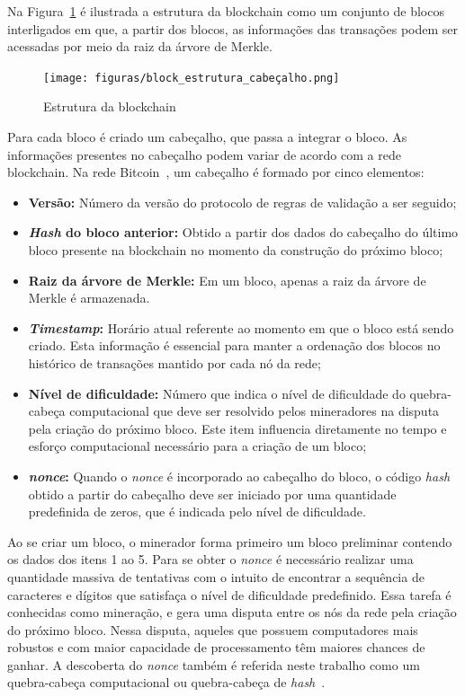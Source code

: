 Na Figura~\ref{fig:blockchain_estrutura} é ilustrada a estrutura da blockchain como um conjunto de blocos interligados em que, a partir dos blocos, as informações das transações podem ser acessadas por meio da raiz da árvore de Merkle. 

\begin{figure}[htb]
 \caption{Estrutura da blockchain}
 \label{fig:blockchain_estrutura}
 \centering
 \texttt{[image: figuras/block\_estrutura\_cabeçalho.png]}
\end{figure}

Para cada bloco é criado um cabeçalho, que passa a integrar o bloco. As informações presentes no cabeçalho podem variar de acordo com a rede blockchain. Na rede Bitcoin~\cite{overview-bitcoin2008nakamoto}, um cabeçalho é formado por cinco elementos:  
\begin{itemize}
    \item \textbf{Versão:} Número da versão do protocolo de regras de validação a ser seguido; 
    \item \textbf{\textit{Hash} do bloco anterior:} Obtido a partir dos dados do cabeçalho do último bloco presente na blockchain no momento da construção do próximo bloco;
    \item \textbf{Raiz da árvore de Merkle:} Em um bloco, apenas a raiz da árvore de Merkle é armazenada. 
    \item \textbf{\textit{Timestamp}:} Horário atual referente ao momento em que o bloco está sendo criado. Esta informação é essencial para manter a ordenação dos blocos no histórico de transações mantido por cada nó da rede;
    \item \textbf{Nível de dificuldade:} Número que indica o nível de dificuldade do quebra-cabeça computacional que deve ser resolvido pelos mineradores na disputa pela criação do próximo bloco. Este item influencia diretamente no tempo e esforço computacional necessário para a criação de um bloco;
    \item \textbf{\textit{nonce}:} Quando o \textit{nonce} é incorporado ao cabeçalho do bloco, o código \textit{hash} obtido a partir do cabeçalho deve ser iniciado por uma quantidade predefinida de zeros, que é indicada pelo nível de dificuldade. 
\end{itemize}


Ao se criar um bloco, o minerador forma primeiro um bloco preliminar contendo os dados dos itens 1 ao 5. Para se obter o \textit{nonce} é necessário realizar uma quantidade massiva de tentativas com o intuito de encontrar a sequência de caracteres e dígitos que satisfaça o nível de dificuldade predefinido. Essa tarefa é conhecidas como mineração, e gera uma disputa entre os nós da rede pela criação do próximo bloco. Nessa disputa, aqueles que possuem computadores mais robustos e com maior capacidade de processamento têm maiores chances de ganhar. A descoberta do \textit{nonce} também é referida neste trabalho como um quebra-cabeça computacional ou quebra-cabeça de \textit{hash}~\cite{overview-blockchainbasic2018drescher, swan2015blockchain-book}. 

